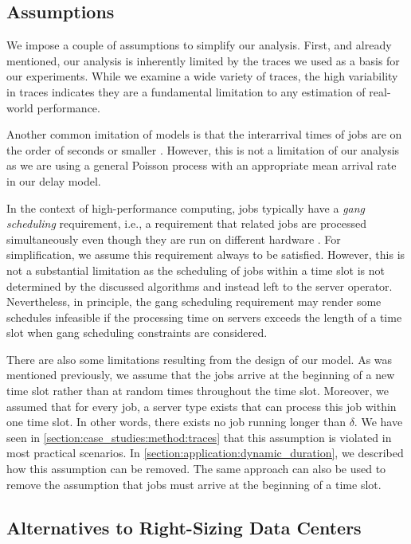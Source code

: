\subsection{Assumptions}

We impose a couple of assumptions to simplify our analysis. First, and already mentioned, our analysis is inherently limited by the traces we used as a basis for our experiments. While we examine a wide variety of traces, the high variability in traces indicates they are a fundamental limitation to any estimation of real-world performance.

Another common imitation of models is that the interarrival times of jobs are on the order of seconds or smaller \cite{Amvrosiadis2018}. However, this is not a limitation of our analysis as we are using a general Poisson process with an appropriate mean arrival rate in our delay model.

In the context of high-performance computing, jobs typically have a \emph{gang scheduling} requirement, i.e., a requirement that related jobs are processed simultaneously even though they are run on different hardware \cite{Amvrosiadis2018}. For simplification, we assume this requirement always to be satisfied. However, this is not a substantial limitation as the scheduling of jobs within a time slot is not determined by the discussed algorithms and instead left to the server operator. Nevertheless, in principle, the gang scheduling requirement may render some schedules infeasible if the processing time on servers exceeds the length of a time slot when gang scheduling constraints are considered.

There are also some limitations resulting from the design of our model. As was mentioned previously, we assume that the jobs arrive at the beginning of a new time slot rather than at random times throughout the time slot. Moreover, we assumed that for every job, a server type exists that can process this job within one time slot. In other words, there exists no job running longer than $\delta$. We have seen in \autoref{section:case_studies:method:traces} that this assumption is violated in most practical scenarios. In \autoref{section:application:dynamic_duration}, we described how this assumption can be removed. The same approach can also be used to remove the assumption that jobs must arrive at the beginning of a time slot.

\subsection{Alternatives to Right-Sizing Data Centers}

